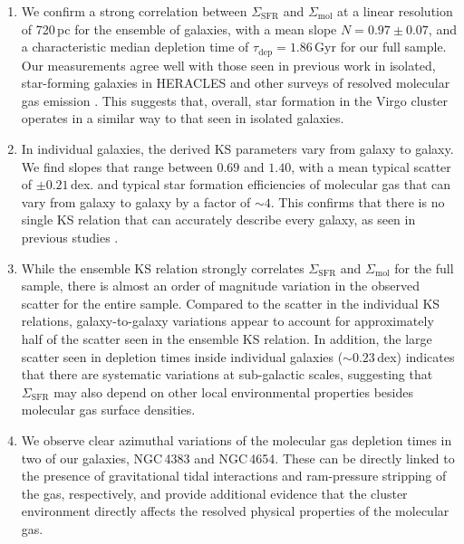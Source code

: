 \documentclass[longauth]{aa}
\begin{document}
\begin{enumerate}
    \item We confirm a strong correlation between $\Sigma_\mathrm{SFR}$ and $\Sigma_\mathrm{mol}$ at a linear resolution of 720\,pc for the ensemble of galaxies, with a mean slope $N=0.97\pm0.07$, and a characteristic median depletion time of $\tau_{\mathrm{dep}}=1.86\,\textrm{Gyr}$ for our full sample. Our measurements agree well with those seen in previous work in isolated, star-forming galaxies in HERACLES \citep{Bigiel2008,Leroy2013} and other surveys of resolved molecular gas emission \citep{Schruba2011,Usero2015,Lin2019,Pessa2021,Querejeta2021}. This suggests that, overall, star formation in the Virgo cluster operates in a similar way to that seen in isolated galaxies.
    
    \item In individual galaxies, the derived KS parameters vary from galaxy to galaxy. We find slopes that range between $0.69$ and $1.40$, with a mean typical scatter of $\pm0.21$\,dex. and typical star formation efficiencies of molecular gas that can vary from galaxy to galaxy by a factor of $\sim 4$. This confirms that there is no single KS relation that can accurately describe every galaxy, as seen in previous studies \citep{Bigiel2008,Saintonge2011,Shetty2013,Zabel2020,Ellison2021}. 
    
    \item While the ensemble KS relation strongly correlates $\Sigma_\mathrm{SFR}$ and $\Sigma_\mathrm{mol}$ for the full sample, there is almost an order of magnitude variation in the observed scatter for the entire sample. Compared to the scatter in the individual KS relations, galaxy-to-galaxy variations appear to account for approximately half of the scatter seen in the ensemble KS relation. In addition, the large scatter seen in depletion times inside individual galaxies ($\sim 0.23$\,dex) indicates that there are systematic variations at sub-galactic scales, suggesting that $\Sigma_\mathrm{SFR}$ may also depend on other local environmental properties besides molecular gas surface densities. 
    
    \item We observe clear azimuthal variations of the molecular gas depletion times in two of our galaxies, NGC\,4383 and NGC\,4654. These can be directly linked to the presence of gravitational tidal interactions and ram-pressure stripping of the gas, respectively, and provide additional evidence that the cluster environment directly affects the resolved physical properties of the molecular gas.
    

\end{enumerate}
\end{document}
